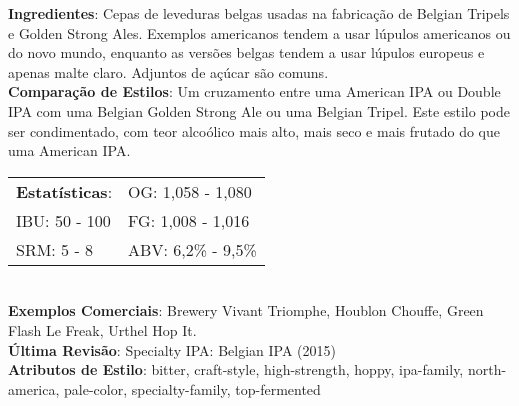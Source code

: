 \textbf{Ingredientes}: Cepas de leveduras belgas usadas na fabricação de Belgian Tripels e Golden Strong Ales. Exemplos americanos tendem a usar lúpulos americanos ou do novo mundo, enquanto as versões belgas tendem a usar lúpulos europeus e apenas malte claro. Adjuntos de açúcar são comuns. \\
\textbf{Comparação de Estilos}: Um cruzamento entre uma American IPA ou Double IPA com uma Belgian Golden Strong Ale ou uma Belgian Tripel. Este estilo pode ser condimentado, com teor alcoólico mais alto, mais seco e mais frutado do que uma American IPA. \\
\begin{tabular}{@{}p{35mm}p{35mm}@{}}
  \textbf{Estatísticas}: & OG: 1,058 - 1,080 \\
  IBU: 50 - 100 & FG: 1,008 - 1,016 \\
  SRM: 5 - 8  & ABV: 6,2\% - 9,5\%
\end{tabular}\\
\textbf{Exemplos Comerciais}: Brewery Vivant Triomphe, Houblon Chouffe, Green Flash Le Freak, Urthel Hop It. \\
\textbf{Última Revisão}: Specialty IPA: Belgian IPA (2015) \\
\textbf{Atributos de Estilo}: bitter, craft-style, high-strength, hoppy, ipa-family, north-america, pale-color, specialty-family, top-fermented
